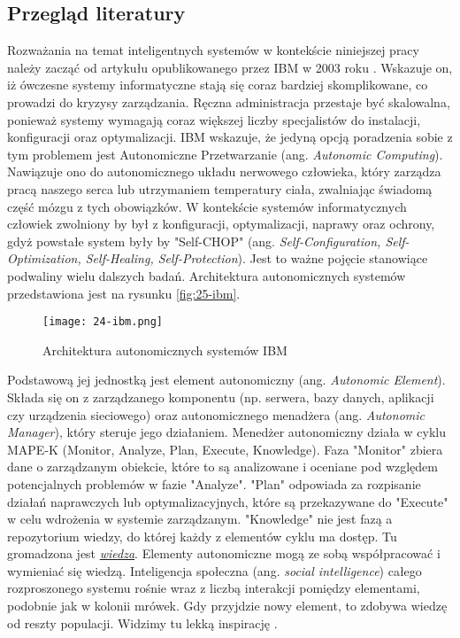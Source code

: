 \subsection{Przegląd literatury}

Rozważania na temat inteligentnych systemów w kontekście niniejszej pracy należy zacząć od artykułu opublikowanego przez IBM w 2003 roku \cite{kephart2003}. Wskazuje on, iż ówczesne systemy informatyczne stają się coraz bardziej skomplikowane, co prowadzi do kryzysy zarządzania. Ręczna administracja przestaje być skalowalna, ponieważ systemy wymagają coraz większej liczby specjalistów do instalacji, konfiguracji oraz optymalizacji. IBM wskazuje, że jedyną opcją poradzenia sobie z tym problemem jest Autonomiczne Przetwarzanie (ang. \textit{Autonomic Computing}). Nawiązuje ono do autonomicznego układu nerwowego człowieka, który zarządza pracą naszego serca lub utrzymaniem temperatury ciała, zwalniając świadomą część mózgu z tych obowiązków. W kontekście systemów informatycznych człowiek zwolniony by był z konfiguracji, optymalizacji, naprawy oraz ochrony, gdyż powstałe system były by "Self-CHOP" (ang. \textit{Self-Configuration, Self-Optimization, Self-Healing, Self-Protection}). Jest to ważne pojęcie stanowiące podwaliny wielu dalszych badań. Architektura autonomicznych systemów przedstawiona jest na rysunku \ref{fig:25-ibm}.

\begin{figure}[!htbp]
    \centering \texttt{[image: 24-ibm.png]}
    \caption{Architektura autonomicznych systemów IBM}\label{fig:24-ibm}
\end{figure}

Podstawową jej jednostką jest element autonomiczny (ang. \textit{Autonomic Element}). Składa się on z zarządzanego komponentu (np. serwera, bazy danych, aplikacji czy urządzenia sieciowego) oraz autonomicznego menadżera (ang. \textit{Autonomic Manager}), który steruje jego działaniem. Menedżer autonomiczny działa w cyklu MAPE-K (Monitor, Analyze, Plan, Execute, Knowledge). Faza "Monitor" zbiera dane o zarządzanym obiekcie, które to są analizowane i oceniane pod względem potencjalnych problemów w fazie "Analyze". "Plan" odpowiada za rozpisanie działań naprawczych lub optymalizacyjnych, które są przekazywane do "Execute" w celu wdrożenia w systemie zarządzanym. "Knowledge" nie jest fazą a repozytorium wiedzy, do której każdy z elementów cyklu ma dostęp. Tu gromadzona jest \hyperlink{def:wiedza}{\textit{wiedza}}. Elementy autonomiczne mogą ze sobą współpracować i wymieniać się wiedzą. Inteligencja społeczna (ang. \textit{social intelligence}) całego rozproszonego systemu rośnie wraz z liczbą interakcji pomiędzy elementami, podobnie jak w kolonii mrówek. Gdy przyjdzie nowy element, to zdobywa wiedzę od reszty populacji. Widzimy tu lekką inspirację \cite{minsky1986}.

